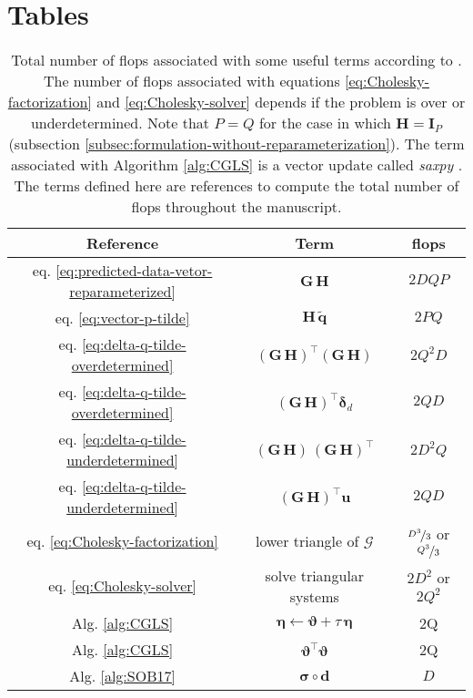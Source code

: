 \section{Tables}

\begin{table}[h!]
	\centering
	\begin{tabular}{c c c}
		Reference & Term & flops \\
		\hline
		eq. \ref{eq:predicted-data-vetor-reparameterized} & $\mathbf{G \, H}$ & $2DQP$ \\
		eq. \ref{eq:vector-p-tilde} & $\mathbf{H} \, \tilde{\mathbf{q}}$ & $2PQ$ \\
		eq. \ref{eq:delta-q-tilde-overdetermined} & $\left(\mathbf{G \, H}\right)^{\top}\left(\mathbf{G \, H}\right)$ & $2Q^{2}D$ \\
		eq. \ref{eq:delta-q-tilde-overdetermined} & $\left(\mathbf{G \, H}\right)^{\top}\boldsymbol{\delta}_{d} $ & $2QD$ \\
		eq. \ref{eq:delta-q-tilde-underdetermined} & $\left(\mathbf{G \, H}\right) \, \left(\mathbf{G \, H}\right)^{\top}$ & $2D^{2}Q$ \\
		eq. \ref{eq:delta-q-tilde-underdetermined} & $\left(\mathbf{G \, H}\right)^{\top}\mathbf{u}$ & $2QD$ \\
		eq. \ref{eq:Cholesky-factorization} & lower triangle of $\boldsymbol{\mathcal{G}}$ & $\nicefrac{D^{3}}{3}$ or $\nicefrac{Q^{3}}{3}$ \\
		eq. \ref{eq:Cholesky-solver} & solve triangular systems & $2D^{2}$ or $2Q^{2}$ \\
		Alg. \ref{alg:CGLS} & $\boldsymbol{\eta} \gets \boldsymbol{\vartheta} + \tau \, \boldsymbol{\eta}$ & 2Q \\
		Alg. \ref{alg:CGLS} & $\boldsymbol{\vartheta}^{\top} \boldsymbol{\vartheta}$ & 2Q \\
		Alg. \ref{alg:SOB17} & $\boldsymbol{\sigma} \circ \mathbf{d}$ & $D$ \\
	\end{tabular}
	\caption{
		Total number of flops associated with some useful terms according to \citet[][p. 12]{golub-vanloan2013}.
		The number of flops associated with equations \ref{eq:Cholesky-factorization} and \ref{eq:Cholesky-solver} 
		depends if the problem is over or underdetermined.
		Note that $P = Q$ for the case in which $\mathbf{H} = \mathbf{I}_{P}$ (subsection \ref{subsec:formulation-without-reparameterization}).
		The term associated with Algorithm \ref{alg:CGLS} is a vector update called \textit{saxpy} \citep[][p. 4]{golub-vanloan2013}.
		The terms defined here are references to compute the total number of flops throughout the manuscript.
	}
	\label{tab:standard-flops}
\end{table}